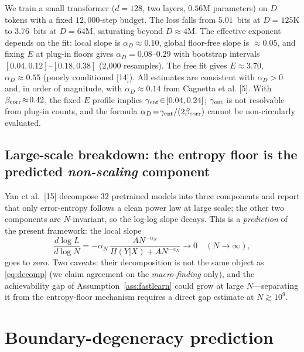 \documentclass[12pt]{article}
\theoremstyle{remark}
\begin{document}
We train a small transformer ($d=128$, two layers, $0.56$M parameters) on $D$
tokens with a fixed $12{,}000$-step budget. The loss falls from $5.01$~bits at
$D=125$K to $3.76$~bits at $D=64$M, saturating beyond $D\!\approx\!4$M. The
effective exponent depends on the fit: local slope is
$\alpha_D\!\approx\!0.10$, global floor-free slope is $\approx\!0.05$, and
fixing $E$ at plug-in floors gives $\alpha_D\!=\!0.08$--$0.29$ with bootstrap
intervals $[0.04,0.12]$--$[0.18,0.38]$ (2{,}000 resamples). The free fit gives
$E\!\approx\!3.70$, $\alpha_D\!\approx\!0.55$ (poorly conditioned
[14]). All estimates are consistent with $\alpha_D>0$ and, in
order of magnitude, with $\alpha_D\!\approx\!0.14$ from Cagnetta et al. [5].
With $\beta_{\rm corr}\!\approx\!0.42$, the fixed-$E$ profile implies
$\gamma_{\rm ent}\!\in\![0.04,0.24]$; $\gamma_{\rm ent}$ is not resolvable
from plug-in counts, and the formula $\alpha_D\!=\!\gamma_{\rm ent}/(2\beta_{\rm corr})$ cannot be non-circularly evaluated.

\subsection{Large-scale breakdown: the entropy floor is the predicted
\emph{non-scaling} component}
\label{sec:yan}

Yan et al.~[15] decompose $32$ pretrained models into three
components and report that only error-entropy follows a clean power law at
large scale; the other two components are $N$-invariant, so the log-log slope
decays. This is a \emph{prediction} of the present framework: the local slope
\begin{equation}
\frac{d\log L}{d\log N}
  = -\alpha_N\,\frac{A N^{-\alpha_N}}{H(Y|X)+A N^{-\alpha_N}}
  \longrightarrow 0 \quad (N\to\infty),
  \label{eq:slope}
\end{equation}
goes to zero. Two caveats: their decomposition is not the same object as
\eqref{eq:decomp} (we claim agreement on the \emph{macro-finding} only), and
the achievability gap of Assumption~\ref{ass:fastlearn} could grow at large
$N$---separating it from the entropy-floor mechanism requires a direct gap
estimate at $N\gtrsim10^9$.

\section{Boundary-degeneracy prediction}
\label{sec:prediction}
\end{document}
